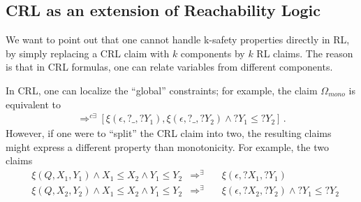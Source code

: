 \subsection{CRL as an extension of Reachability Logic}

We want to point out that one cannot handle k-safety properties directly
in RL, by simply replacing a CRL claim with $k$ components by $k$ RL
claims. The reason is that in CRL formulas, one can relate variables from different components. 


In CRL, one can localize the ``global'' constraints; for example, the claim $\Omega_{\textit{mono}}$
is equivalent to
\begin{align*}
[\xi(P, X_1, Y_1),\xi(P, X_2, Y_2) \land X_1 \leq X_2 \land Y_1 \leq Y_2] 
\Rightarrow^{c\exists}
[\xi(\epsilon, ?\_, ?Y_1), \xi(\epsilon, ?\_, ?Y_2) \land ?Y_1 \leq ?Y_2] \, .
\end{align*}
However, if one were to ``split'' the CRL claim into two, the resulting claims might express
a different property than monotonicity.
For example, the two claims
\begin{align}
& \xi(Q, X_1, Y_1) \land X_1 \leq X_2 \land Y_1 \leq Y_2 & \Rightarrow^{\exists} \quad & \xi(\epsilon, ?X_1, ?Y_1) \\
& \xi(Q, X_2, Y_2) \land X_1 \leq X_2 \land Y_1 \leq Y_2 & \Rightarrow^{\exists} \quad  & \xi(\epsilon, ?X_2, ?Y_2) \land ?Y_1 \leq ?Y_2
\end{align}
